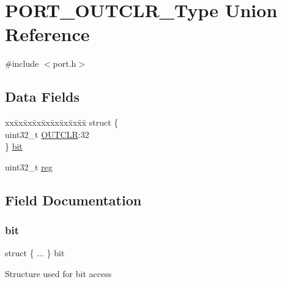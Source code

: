 \hypertarget{union_p_o_r_t___o_u_t_c_l_r___type}{}\section{P\+O\+R\+T\+\_\+\+O\+U\+T\+C\+L\+R\+\_\+\+Type Union Reference}
\label{union_p_o_r_t___o_u_t_c_l_r___type}


{\ttfamily \#include $<$port.\+h$>$}

\subsection*{Data Fields}
\begin{DoxyCompactItemize}
\item 
\begin{tabbing}
xx\=xx\=xx\=xx\=xx\=xx\=xx\=xx\=xx\=\kill
struct \{\\
\>uint32\_t \mbox{\hyperlink{union_p_o_r_t___o_u_t_c_l_r___type_ab58fff0afe4a437076a58dc6a0bf2b6c}{OUTCLR}}:32\\
\} \mbox{\hyperlink{union_p_o_r_t___o_u_t_c_l_r___type_a1693ab9f34d2c5a9f5aa9548ded9b92c}{bit}}\\

\end{tabbing}\item 
uint32\+\_\+t \mbox{\hyperlink{union_p_o_r_t___o_u_t_c_l_r___type_a6b91636401516a477989a336376d7b40}{reg}}
\end{DoxyCompactItemize}


\subsection{Field Documentation}
\mbox{\label{union_p_o_r_t___o_u_t_c_l_r___type_a1693ab9f34d2c5a9f5aa9548ded9b92c}} 
\subsubsection{\texorpdfstring{bit}{bit}}
{\footnotesize\ttfamily struct \{ ... \}   bit}

Structure used for bit access \mbox{\label{union_p_o_r_t___o_u_t_c_l_r___type_ab58fff0afe4a437076a58dc6a0bf2b6c}} 
